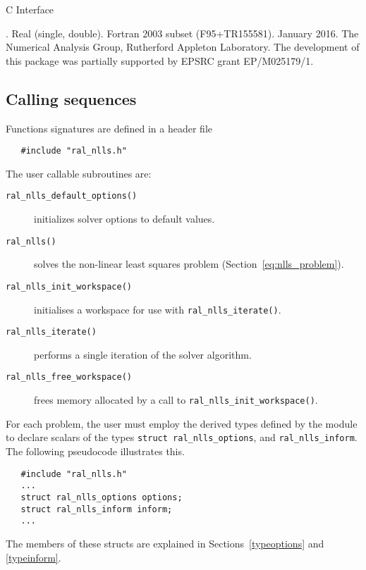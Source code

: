 \documentclass{spec}
\begin{document}
\hslheader

\begin{center}
\huge \sc  C Interface
\end{center}

\hslsummary



\hslattributes
\hslversions{\versionum\ (\versiondate)}.
\hslIRDCZ Real (single, double).
\hsllanguage Fortran 2003 subset (F95+TR155581).
\hsldate January 2016.
\hslorigin The Numerical Analysis Group, Rutherford Appleton Laboratory.
\hslremark The development of this package was
partially supported by EPSRC grant EP/M025179/1.

\newpage
\hslhowto

\subsection{Calling sequences}

Functions signatures are defined in a header file
\begin{verbatim}
   #include "ral_nlls.h"
\end{verbatim}
\medskip

\noindent The user callable subroutines are:
\vspace{-0.1cm}
\begin{description}
   \item[\texttt{ral\_nlls\_default\_options()}] initializes solver options to default values.
   \item[\texttt{ral\_nlls()}]  solves the non-linear least squares problem (Section~\ref{eq:nlls_problem}).
   \item[\texttt{ral\_nlls\_init\_workspace()}] initialises a workspace for use with \texttt{ral\_nlls\_iterate()}.
   \item[\texttt{ral\_nlls\_iterate()}] performs a single iteration of the solver algorithm.
   \item[\texttt{ral\_nlls\_free\_workspace()}] frees memory allocated by a call to \texttt{ral\_nlls\_init\_workspace()}.
\end{description}


\hsltypes
\label{derived types}
For each problem, the user must employ the derived types defined by the
module to declare scalars of the types {\tt struct ral\_nlls\_options}, and
{\tt ral\_nlls\_inform}.
The following pseudocode illustrates this.
\begin{verbatim}
   #include "ral_nlls.h"
   ...
   struct ral_nlls_options options;
   struct ral_nlls_inform inform;
   ...
\end{verbatim}
The members of these structs are explained
in Sections~\ref{typeoptions} and \ref{typeinform}.
\end{document}
